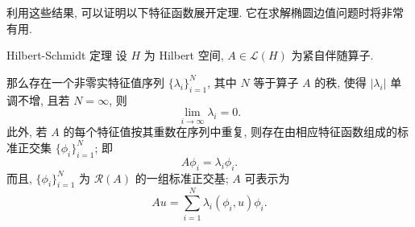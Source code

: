 利用这些结果, 可以证明以下特征函数展开定理. 它在求解椭圆边值问题时将非常有用.

\begin{Theorem}{Hilbert-Schmidt 定理}
\label{thm:hilbert-schmidt-spectral}
设 $H$ 为 Hilbert 空间, $A\in\mathcal{L}(H)$ 为紧自伴随算子.

那么存在一个非零实特征值序列 $\{\lambda_i\}_{i=1}^N$, 其中 $N$ 等于算子 $A$ 的秩, 使得 $|\lambda_i|$ 单调不增, 且若 $N=\infty$, 则
\begin{equation}\label{eq:compact-self-adjoint-nonzero-eigenvalue-limit}
\lim_{i\to\infty}\lambda_i=0.
\end{equation}
此外, 若 $A$ 的每个特征值按其重数在序列中重复, 则存在由相应特征函数组成的标准正交集 $\{\phi_i\}_{i=1}^N$; 即
\begin{equation}\label{eq:compact-self-adjoint-eigenfunction-equations}
A\phi_i=\lambda_i\phi_i.
\end{equation}
而且, $\{\phi_i\}_{i=1}^N$ 为 $\mathcal{R}(A)$ 的一组标准正交基; $A$ 可表示为
\begin{equation}\label{eq:hilbert-schmidt-operator-eigenfunction-expansion}
Au=\sum_{i=1}^N\lambda_i(\phi_i,u)\phi_i.
\end{equation}

\end{Theorem}

